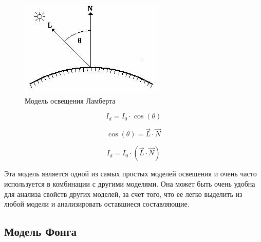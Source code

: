 \begin{figure}[H]
	\centering
	\includegraphics[width=1\linewidth]{inc/img/lambert}
	\caption[]{Модель освещения Ламберта}
	\label{fig:lambert}
\end{figure}

\begin{equation}
	I_d=I_0 \cdot \cos(\theta)
\end{equation}

\begin{equation}
	\cos(\theta)=\vec{L}\cdot\vec{N}
\end{equation}							

\begin{equation}
	I_d=I_0\cdot(\vec{L}\cdot\vec{N})
\end{equation}

Эта модель является одной из самых простых моделей освещения и очень часто используется в комбинации с другими моделями. Она может быть очень удобна для анализа свойств других моделей, за счет того, что ее легко выделить из любой модели и анализировать оставшиеся составляющие. 

\subsection{Модель Фонга}

